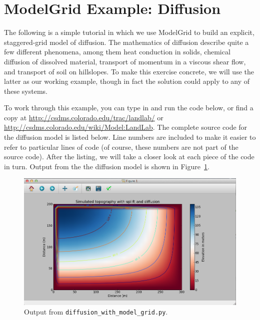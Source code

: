 \documentclass[12pt]{article}
\newcommand{\code}[1]{{\tt #1}}
\begin{document}
\section{ModelGrid Example: Diffusion} 

The following is a simple tutorial in which we use ModelGrid to build an explicit, staggered-grid model of diffusion. The mathematics of diffusion describe quite a few different phenomena, among them heat conduction in solids, chemical diffusion of dissolved material, transport of momentum in a viscous shear flow, and transport of soil on hillslopes. To make this exercise concrete, we will use the latter as our working example, though in fact the solution could apply to any of these systems.

To work through this example, you can type in and run the code below, or find a copy at \url{http://csdms.colorado.edu/trac/landlab/} or \url{http://csdms.colorado.edu/wiki/Model:LandLab}. The complete source code for the diffusion model is listed below. Line numbers are included to make it easier to refer to particular lines of code (of course, these numbers are not part of the source code). After the listing, we will take a closer look at each piece of the code in turn. Output from the the diffusion model is shown in Figure~\ref{basicdiffmod}.

 \begin{figure}[h!]
    \centering
    \includegraphics[scale=0.45]{basic_diffusion_example.png}
    \caption{Output from \code{diffusion\_with\_model\_grid.py}.}
   \label{basicdiffmod}
\end{figure}




\end{document}
